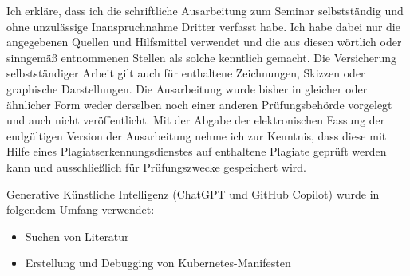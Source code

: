 \documentclass[11pt,a4paper]{article}
\begin{document}
Ich erkläre, dass ich die schriftliche Ausarbeitung zum Seminar selbstständig
und ohne unzulässige Inanspruchnahme Dritter verfasst habe. Ich habe dabei nur
die angegebenen Quellen und Hilfsmittel verwendet und die aus diesen wörtlich
oder sinngemäß entnommenen Stellen als solche kenntlich gemacht. Die Versicherung
selbstständiger Arbeit gilt auch für enthaltene Zeichnungen, Skizzen oder
graphische Darstellungen. Die Ausarbeitung wurde bisher in gleicher oder ähnlicher
Form weder derselben noch einer anderen Prüfungsbehörde vorgelegt und auch nicht
veröffentlicht. Mit der Abgabe der elektronischen Fassung der endgültigen Version
der Ausarbeitung nehme ich zur Kenntnis, dass diese mit Hilfe eines
Plagiatserkennungsdienstes auf enthaltene Plagiate geprüft werden kann und
ausschließlich für Prüfungszwecke gespeichert wird.


Generative Künstliche Intelligenz (ChatGPT und GitHub Copilot) wurde in folgendem Umfang verwendet:
\begin{itemize}
  \item Suchen von Literatur
  \item Erstellung und Debugging von Kubernetes-Manifesten
\end{itemize}


\newpage
\printbibliography
\end{document}

